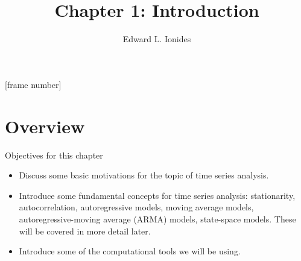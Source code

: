 



\newcommand\CHAPTER{1}
 \newcommand\answer[2]{#1} %

\title{\vspace{2mm} \\ \vspace{2mm}
Chapter \CHAPTER: Introduction}
\author{Edward L. Ionides}
\date{}

[frame number]






\maketitle



\section{Overview}

\begin{frame}{Objectives for this chapter}
  \begin{itemize}
  \item Discuss some basic motivations for the topic of time series analysis.
  \item Introduce some fundamental concepts for time series analysis: stationarity, autocorrelation, autoregressive models, moving average models, autoregressive-moving average (ARMA) models, state-space models. These will be covered in more detail later.
  \item Introduce some of the computational tools we will be using.
  \end{itemize}
\end{frame}

